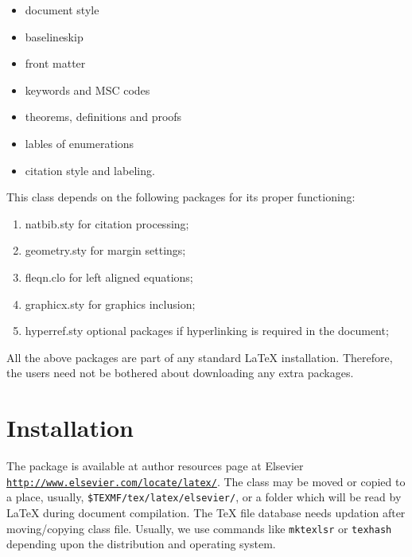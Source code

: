 \documentclass[a4paper,fleqn]{cas-dc}
\begin{document}
\renewcommand\labelitemi{\small$\bullet$} %
\begin{itemize} 
\itemsep=-1pt 		%
\itemindent=-3pt 	%
\item document style \item baselineskip \item front
matter \item keywords and MSC codes \item theorems, definitions and
proofs \item lables of enumerations \item citation style and labeling.
\end{itemize}

This class depends on the following packages
for its proper functioning: 

\begin{enumerate}
\itemsep=-1pt 		%
\itemindent=0pt 	%
\item {natbib.sty} for citation processing;
\item {geometry.sty} for margin settings;
\item {fleqn.clo} for left aligned equations;
\item {graphicx.sty} for graphics inclusion;
\item {hyperref.sty} optional packages if hyperlinking is
  required in the document;
\end{enumerate}  

All the above packages are part of any
standard \LaTeX{} installation.
Therefore, the users need not be
bothered about downloading any extra packages.

\lipsum[3]
%
\section{Installation}
The package is available at author resources page at Elsevier
\href{http://www.elsevier.com/locate/latex/}{\nolinkurl{http://www.elsevier.com/locate/latex/}}. %
The class may be moved or copied to a place, usually,
\verb+$TEXMF/tex/latex/elsevier/+, %
or a folder which will be read by \LaTeX{} during document compilation. The \TeX{} file
database needs updation after moving/copying class file.  Usually,
we use commands like \verb+mktexlsr+ or \verb+texhash+ depending
upon the distribution and operating system. 
\end{document}
